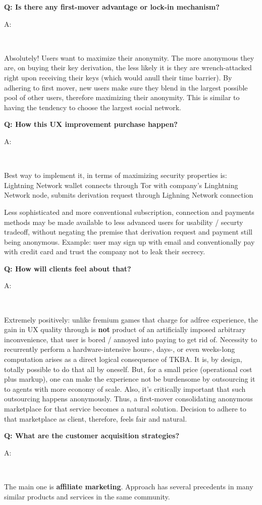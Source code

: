 \documentclass[12pt,a4paper]{article}
\newenvironment{question}[1]{%
  \vspace{0.8em}\noindent\textbf{Q: #1}\par
  \vspace{0.2em}\noindent\begin{itshape}A:\end{itshape}~%
}{\vspace{0.8em}}
\begin{document}
\begin{question}{Is there any first-mover advantage or lock-in mechanism?}
Absolutely! Users want to maximize their anonymity. The more anonymous they are, on buying their key derivation, the less likely it is they are wrench-attacked right upon receiving their keys (which would anull their time barrier). By adhering to first mover, new users make sure they blend in the largest possible pool of other users, therefore maximizing their anonymity. This is similar to having the tendency to choose the largest social network.
\end{question}

\begin{question}{How this UX improvement purchase happen?}
Best way to implement it, in terms of maximizing security properties is:
Lightning Network wallet connects through Tor with company's Linghtning Network node, submits derivation request through Lighning Network connection 

Less sophisticated and more conventional subscription, connection and payments methods may be made available to less advanced users for usability / securty tradeoff, without negating the premise that derivation request and payment still being anonymous. Example: user may sign up with email and conventionally pay with credit card and trust the company not to leak their secrecy.
\end{question}

\begin{question}{How will clients feel about that?}
Extremely positively: unlike fremium games that charge for adfree experience, the gain in UX quality through is \textbf{not} product of an artificially imposed arbitrary inconvenience, that user is bored / annoyed into paying to get rid of. Necessity to recurrently perform a hardware-intensive hours-, days-, or even weeks-long computation arises as a direct logical consequence of TKBA. It is, by design, totally possible to do that all by oneself. But, for a small price (operational cost plus markup), one can make the experience not be burdensome by outsourcing it to agents with more economy of scale. Also, it's critically important that such outsourcing happens anonymously. Thus, a first-mover consolidating anonymous marketplace for that service becomes a natural solution. Decision to adhere to that marketplace as client, therefore, feels fair and natural.
\end{question}

\begin{question}{What are the customer acquisition strategies?}
The main one is \textbf{affiliate marketing}. Approach has several precedents in many similar products and services in the same community.
\end{question}
\end{document}
